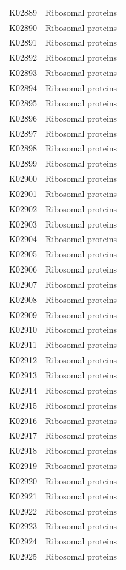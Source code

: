 \begin{longtable}{@{}l l@{}}
K02889 & Ribosomal proteins \\
K02890 & Ribosomal proteins \\
K02891 & Ribosomal proteins \\
K02892 & Ribosomal proteins \\
K02893 & Ribosomal proteins \\
K02894 & Ribosomal proteins \\
K02895 & Ribosomal proteins \\
K02896 & Ribosomal proteins \\
K02897 & Ribosomal proteins \\
K02898 & Ribosomal proteins \\
K02899 & Ribosomal proteins \\
K02900 & Ribosomal proteins \\
K02901 & Ribosomal proteins \\
K02902 & Ribosomal proteins \\
K02903 & Ribosomal proteins \\
K02904 & Ribosomal proteins \\
K02905 & Ribosomal proteins \\
K02906 & Ribosomal proteins \\
K02907 & Ribosomal proteins \\
K02908 & Ribosomal proteins \\
K02909 & Ribosomal proteins \\
K02910 & Ribosomal proteins \\
K02911 & Ribosomal proteins \\
K02912 & Ribosomal proteins \\
K02913 & Ribosomal proteins \\
K02914 & Ribosomal proteins \\
K02915 & Ribosomal proteins \\
K02916 & Ribosomal proteins \\
K02917 & Ribosomal proteins \\
K02918 & Ribosomal proteins \\
K02919 & Ribosomal proteins \\
K02920 & Ribosomal proteins \\
K02921 & Ribosomal proteins \\
K02922 & Ribosomal proteins \\
K02923 & Ribosomal proteins \\
K02924 & Ribosomal proteins \\
K02925 & Ribosomal proteins \\

\end{longtable}
